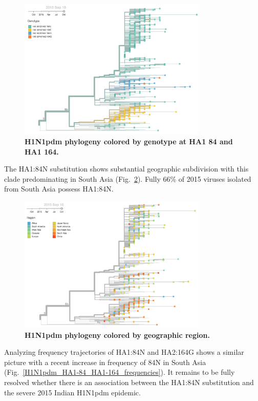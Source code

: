 \documentclass[11pt,oneside,letterpaper]{article}
\begin{document}
\begin{figure}[h!]
	\centering		
	\includegraphics[width=0.8\textwidth]{../figures/sep-2015/H1N1pdm_HA2-164_HA1-84.png}
	\caption{\textbf{H1N1pdm phylogeny colored by genotype at HA1 84 and HA1 164.} 
	}
	\label{H1N1pdm_HA2-164_HA1-84}
\end{figure}

The HA1:84N substitution shows substantial geographic subdivision with this clade predominating in South Asia (Fig.~\ref{H1N1pdm_geo}). Fully 66\% of 2015 viruses isolated from South Asia possess HA1:84N. 

\begin{figure}[h!]
	\centering		
	\includegraphics[width=0.8\textwidth]{../figures/sep-2015/H1N1pdm_geo.png}
	\caption{\textbf{H1N1pdm phylogeny colored by geographic region.} 
	}
	\label{H1N1pdm_geo}
\end{figure}

Analyzing frequency trajectories of HA1:84N and HA2:164G shows a similar picture with a recent increase in frequency of 84N in South Asia (Fig.~\ref{H1N1pdm_HA1-84_HA1-164_frequencies}). It remains to be fully resolved whether there is an association between the HA1:84N substitution and the severe 2015 Indian H1N1pdm epidemic.
\end{document}
